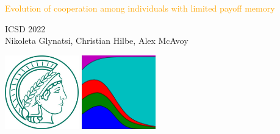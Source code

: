 \documentclass{beamer}
\begin{document}
\begin{frame}
    \begin{center}
        \Large{\textcolor{orange}{Evolution of cooperation among individuals with limited payoff memory}} \\
        \vspace{.5cm}

        \vspace{1cm}
        \normalsize{ICSD 2022} \\
        \vspace{.5cm}
        \normalsize{Nikoleta Glynatsi, Christian Hilbe, Alex McAvoy}

    \end{center}
\end{frame}


\begin{frame}
    \begin{center}
    \includegraphics[width=0.24\textwidth]{static/mpi.jpg}\hspace{8pt}
    \includegraphics[width=0.24\textwidth]{static/axelrod-logo.png}
    


    \end{center}
\end{frame}

\end{document}
